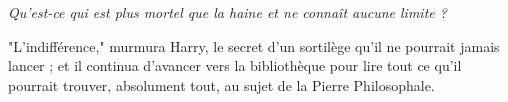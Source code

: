 \emph{Qu'est-ce qui est plus mortel que la haine et ne connaît aucune limite ?} 

"L'indifférence," murmura Harry, le secret d'un sortilège qu'il ne pourrait jamais lancer ; et il continua d'avancer vers la bibliothèque pour lire tout ce qu'il pourrait trouver, absolument tout, au sujet de la Pierre Philosophale.

